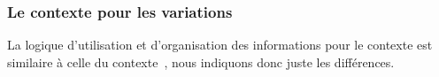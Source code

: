 \documentclass{tutodoc}
\begin{document}

\subsubsection{Le contexte  pour les variations}

La logique d'utilisation et d'organisation des informations pour le contexte  est similaire à celle du contexte \,, nous indiquons donc juste les différences.
%
\end{document}
